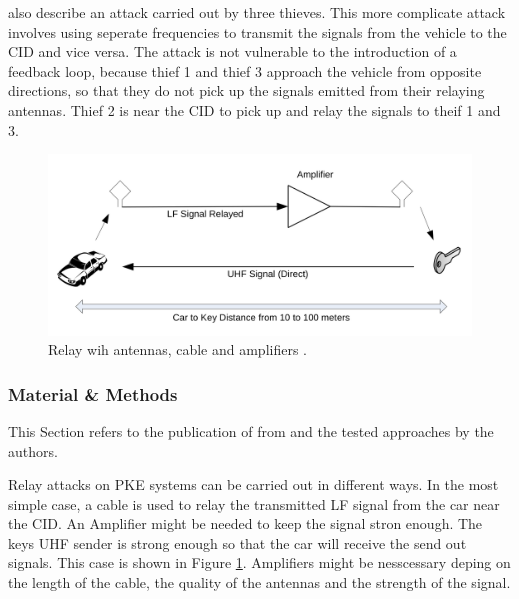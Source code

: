 	\label{par:threeThieves}
	\citeauthor{someAttacksPKES} also describe an attack carried out by three thieves.
	This more complicate attack involves using seperate frequencies to transmit the signals
	from the vehicle to the CID and vice versa.
	The attack is not vulnerable to the introduction of a feedback loop,
	because thief 1 and thief 3 approach the vehicle from opposite directions,
	so that they do not pick up the signals emitted from their relaying antennas.
	Thief 2 is near the CID to pick up and relay the signals to theif 1 and 3.

	\begin{figure}[ht!]
		\begin{center}
			\includegraphics[width=\textwidth]{pictures/franc_relay_over_the_wire.png}
		\end{center}
		\caption{Relay wih antennas, cable and amplifiers \citep[p. 5]{relayAttacksFranc}.}
		\label{fig:relayOTW}
	\end{figure}


\subsubsection*{Material \& Methods}
	\label{sec:matmet}
	This Section refers to the publication of \citeauthor{relayAttacksFranc} from \citeyear{relayAttacksFranc}
	and the tested approaches by the authors.

	Relay  attacks on PKE systems can be carried out in different ways.
	In the most simple case,
	a cable is used to relay the transmitted LF signal from the car near the CID.
	An Amplifier might be needed to keep the signal stron enough.
	The keys UHF sender is strong enough so that the car will receive the send out signals.
	This case is shown in Figure \ref{fig:relayOTW}.
	Amplifiers might be nesscessary deping on the length of the cable,
	the quality of the antennas and the strength of the signal.

